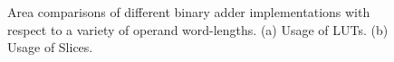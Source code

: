 \documentclass[conference]{IEEEtran}
\begin{document}
\begin{figure}[tbp]
  \centering
  \caption{Area comparisons of different binary adder implementations with respect to a variety of operand word-lengths. (a) Usage of LUTs. (b) Usage of Slices.}
  \label{Fig:AdderArea}
  \vspace{-1ex}
\end{figure}
\end{document}

